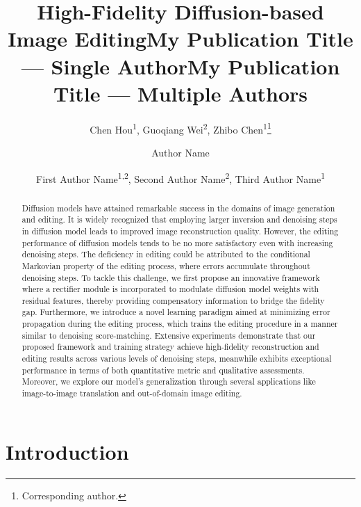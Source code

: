 \documentclass[letterpaper]{article} %
\title{High-Fidelity Diffusion-based Image Editing}
\author{
    Chen Hou\textsuperscript{\rm 1},
    Guoqiang Wei\textsuperscript{\rm 2},
    Zhibo Chen\textsuperscript{\rm 1}\thanks{Corresponding author.}
}
\title{My Publication Title --- Single Author}
\author {
    Author Name
}
\title{My Publication Title --- Multiple Authors}
\author {
    First Author Name\textsuperscript{\rm 1,\rm 2},
    Second Author Name\textsuperscript{\rm 2},
    Third Author Name\textsuperscript{\rm 1}
}
\begin{document}
\maketitle

\begin{abstract}
Diffusion models have attained remarkable success in the domains of image generation and editing. It is widely recognized that employing larger inversion and denoising steps in diffusion model leads to improved image reconstruction quality. However, the editing performance of diffusion models tends to be no more satisfactory even with increasing denoising steps.
The deficiency in editing could be attributed to the conditional Markovian property of the editing process, where errors accumulate throughout denoising steps.
To tackle this challenge, we first propose an innovative framework where a rectifier module is incorporated to modulate diffusion model weights with residual features, thereby providing compensatory information to bridge the fidelity gap.
Furthermore, we introduce a novel learning paradigm aimed at minimizing error propagation during the editing process, which trains the editing procedure in a manner similar to denoising score-matching.
Extensive experiments demonstrate that our proposed framework and training strategy achieve high-fidelity reconstruction and editing results across various levels of denoising steps, meanwhile exhibits exceptional performance in terms of both quantitative metric and qualitative assessments.
Moreover, we explore our model's generalization through several applications like image-to-image translation and out-of-domain image editing.
\end{abstract}

\section{Introduction}
\end{document}
